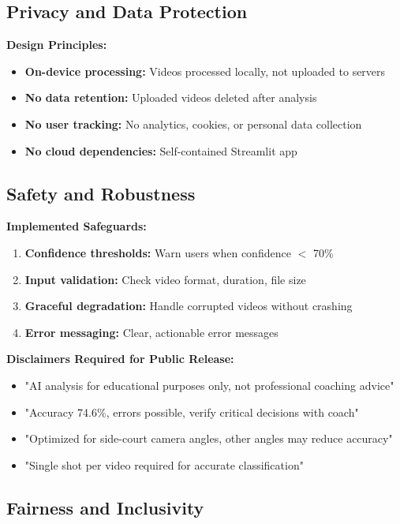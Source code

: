 \documentclass[12pt,a4paper]{article}
\begin{document}
\subsection{Privacy and Data Protection}

\textbf{Design Principles:}
\begin{itemize}
\item \textbf{On-device processing:} Videos processed locally, not uploaded to servers
\item \textbf{No data retention:} Uploaded videos deleted after analysis
\item \textbf{No user tracking:} No analytics, cookies, or personal data collection
\item \textbf{No cloud dependencies:} Self-contained Streamlit app
\end{itemize}

\subsection{Safety and Robustness}

\textbf{Implemented Safeguards:}
\begin{enumerate}
\item \textbf{Confidence thresholds:} Warn users when confidence $<$ 70\%
\item \textbf{Input validation:} Check video format, duration, file size
\item \textbf{Graceful degradation:} Handle corrupted videos without crashing
\item \textbf{Error messaging:} Clear, actionable error messages
\end{enumerate}

\textbf{Disclaimers Required for Public Release:}
\begin{itemize}
\item "AI analysis for educational purposes only, not professional coaching advice"
\item "Accuracy 74.6\%, errors possible, verify critical decisions with coach"
\item "Optimized for side-court camera angles, other angles may reduce accuracy"
\item "Single shot per video required for accurate classification"
\end{itemize}

\subsection{Fairness and Inclusivity}
\end{document}
